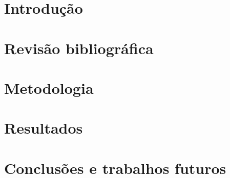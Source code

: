 \documentclass[mestrado, pre-defesa, spanish, english, brazil]{packages/icmc}
\begin{document}
\textual


\setcounter{page}{16}
\chapter{Introdução}
\label{chapter:introducao}



\chapter{Revisão bibliográfica}
\label{chapter:revisao}




\chapter{Metodologia}
\label{chapter:metodologia}



\chapter{Resultados}
\label{chapter:resultados}


\chapter{Conclusões e trabalhos futuros}
\label{chapter:conclusao}






\postextual

%




\end{document}
